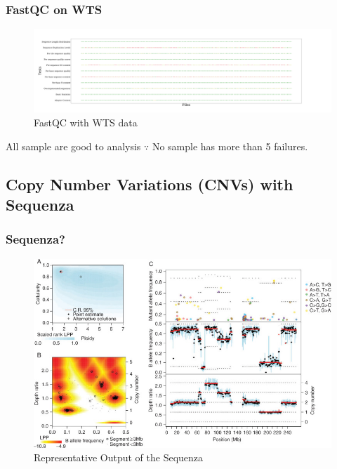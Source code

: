 \documentclass{beamer}
\begin{document}
    \begin{frame}
        \frametitle{FastQC on WTS}

        \begin{figure}
            \includegraphics[width=\linewidth]{figures/FastQC/FastQC_WTS.pdf}
            \caption{FastQC with WTS data}
        \end{figure}

        \begin{exampleblock}{All sample are good to analysis}
            $\because$ No sample has more than 5 failures.
        \end{exampleblock}
    \end{frame}

    \subsection{Copy Number Variations (CNVs) with Sequenza}
    \begin{frame}
        \frametitle{Sequenza?}

        \begin{figure}
            \includegraphics[width=0.6 \linewidth]{figures/Workflow/sequenza.jpg}
            \caption{Representative Output of the Sequenza \protect\cite{sequenza1}}
        \end{figure}
    \end{frame}
\end{document}
